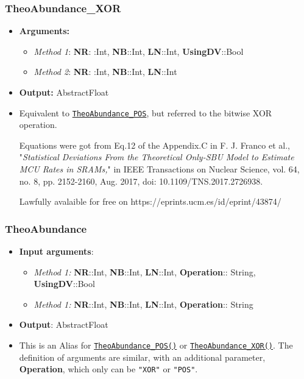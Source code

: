 \subsubsection*{TheoAbundance\_XOR}\label{Subsec:TheoAbundance_XOR}
%
\begin{itemize}
	\item \textbf{Arguments:}
	\begin{itemize}
		\item \textit{Method 1}: \textbf{NR}: :Int, \textbf{NB}::Int, \textbf{LN}::Int, \textbf{UsingDV}::Bool
		\item \textit{Method 2}: \textbf{NR}: :Int, \textbf{NB}::Int, \textbf{LN}::Int
	\end{itemize}
	\item \textbf{Output:} AbstractFloat
	\item Equivalent to \hyperref[Subsec:TheoAbundance_POS]{\texttt{TheoAbundance\_POS}}, but referred to the bitwise XOR operation. 
	
	Equations were got from Eq.12 of the Appendix.C in 
	F. J. Franco et al., "\textit{Statistical Deviations From the Theoretical Only-SBU
		Model to Estimate MCU Rates in SRAMs,}" in IEEE Transactions on Nuclear
	Science, vol. 64, no. 8, pp. 2152-2160, Aug. 2017,
	doi: 10.1109/TNS.2017.2726938. 
	
	Lawfully avalaible for free on https://eprints.ucm.es/id/eprint/43874/
\end{itemize}
%
\subsubsection*{TheoAbundance}\label{Subsec:TheoAbundance}
%
\begin{itemize}
	\item \textbf{Input arguments}:
	\begin{itemize}
		\item \textit{Method 1:} \textbf{NR}::Int, \textbf{NB}::Int, \textbf{LN}::Int, \textbf{Operation}:: String, \textbf{UsingDV}::Bool
		\item \textit{Method 1:} \textbf{NR}::Int, \textbf{NB}::Int, \textbf{LN}::Int, \textbf{Operation}:: String
	\end{itemize}
	\item \textbf{Output}: AbstractFloat
	\item This is an Alias for \hyperref[Subsec:TheoAbundance_POS]{ \texttt{TheoAbundance\_POS()}} or \hyperref[Subsec:TheoAbundance_XOR]{ \texttt{TheoAbundance\_XOR()}}. The definition of arguments are similar, with an additional parameter, \textbf{Operation}, which only can be \texttt{"XOR"} or \texttt{"POS"}. 
	
\end{itemize}

